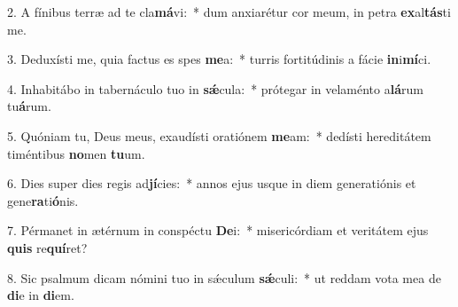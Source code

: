 2. A fínibus terræ ad te cla\textbf{má}vi:~*  dum anxiarétur cor meum, in petra \textbf{ex}al\textbf{tás}ti me.\

3. Deduxísti me, quia factus es spes \textbf{me}a:~*  turris fortitúdinis a fácie \textbf{in}i\textbf{mí}ci.\

4. Inhabitábo in tabernáculo tuo in \textbf{sǽ}cula:~*  prótegar in velaménto a\textbf{lá}rum tu\textbf{á}rum.\

5. Quóniam tu, Deus meus, exaudísti oratiónem \textbf{me}am:~*  dedísti hereditátem timéntibus \textbf{no}men \textbf{tu}um.\

6. Dies super dies regis ad\textbf{jí}cies:~*  annos ejus usque in diem generatiónis et gene\textbf{ra}ti\textbf{ó}nis.\

7. Pérmanet in ætérnum in conspéctu \textbf{De}i:~*  misericórdiam et veritátem ejus \textbf{quis} re\textbf{quí}ret?\

8. Sic psalmum dicam nómini tuo in sǽculum \textbf{sǽ}culi:~*  ut reddam vota mea de \textbf{di}e in \textbf{di}em.\

